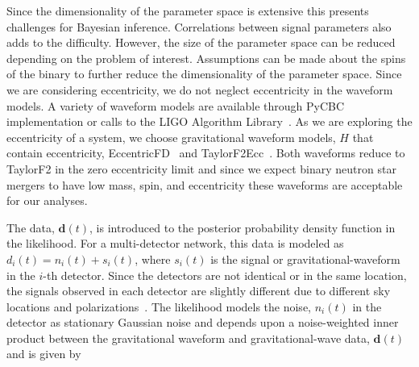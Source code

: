 Since the dimensionality of the parameter space is extensive this presents challenges for Bayesian inference. Correlations between signal parameters also adds to the difficulty. However, the size of the parameter space can be reduced depending on the problem of interest. Assumptions can be made about the spins of the binary to further reduce the dimensionality of the parameter space. Since we are considering eccentricity, we do not neglect eccentricity in the waveform models. A variety of waveform models are available through PyCBC implementation or calls to the LIGO Algorithm Library~\cite{lalsuite}. As we are exploring the eccentricity of a system, we choose gravitational waveform models, $H$ that contain eccentricity, EccentricFD~\cite{Huerta:2014eca} and TaylorF2Ecc~\cite{Moore:2016qxz}. Both waveforms reduce to TaylorF2 in the zero eccentricity limit and since we expect binary neutron star mergers to have low mass, spin, and eccentricity these waveforms are acceptable for our analyses.

The data, $\boldsymbol{d}(t)$, is introduced to the posterior probability density function in the likelihood. For a multi-detector network, this data is modeled as $d_i(t) = n_i(t) + s_i(t)$, where $s_i(t)$ is the signal or gravitational-waveform in the $i$-th detector. Since the detectors are not identical or in the same location, the signals observed in each detector are slightly different due to different sky locations and polarizations~\cite{Wahlquist:1987rx}. The likelihood models the noise, $n_i(t)$ in the detector as stationary Gaussian noise and depends upon a noise-weighted inner product between the gravitational waveform and gravitational-wave data, $\boldsymbol{d}(t)$ and is given by~\cite{wainstein:1962}

